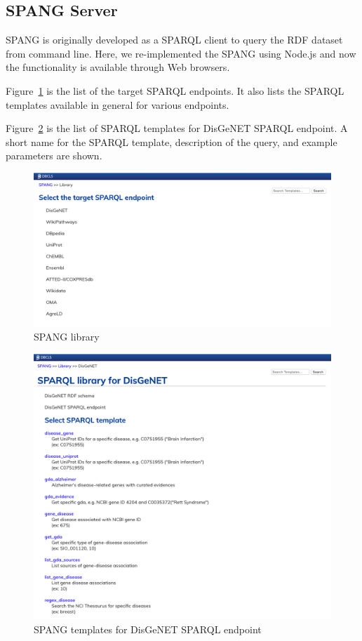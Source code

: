 \documentclass[runningheads]{llncs}
\begin{document}
\subsection{SPANG Server}
SPANG is originally developed as a SPARQL client to query the RDF dataset from command line. Here, we re-implemented the SPANG using Node.js and now the functionality is available through Web browsers. 


Figure~\ref{fig:spang_lib} is the list of the target SPARQL endpoints. It also lists the SPARQL templates available in general for various endpoints.

Figure~\ref{fig:spang_disgenet} is the list of SPARQL templates for DisGeNET SPARQL endpoint.
A short name for the SPARQL template, description of the query, and example parameters are shown.


\begin{figure}
\center
\includegraphics[width=1.0\textwidth]{spang_lib.png}
\caption{SPANG library}
\label{fig:spang_lib}
\end{figure}


\begin{figure}
\center
\includegraphics[width=1.0\textwidth]{spang_disgenet.png}
\caption{SPANG templates for DisGeNET SPARQL endpoint}
\label{fig:spang_disgenet}
\end{figure}
\end{document}
